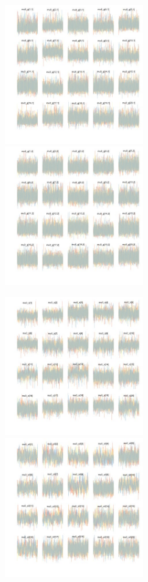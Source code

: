 \documentclass[varwidth=\maxdimen,border=0pt]{standalone}
\begin{document}
    

\begin{figure}

    \begin{subfigure}{6cm}
        \centering
                \includegraphics[width=6cm]{../../figures/convergence/convergence-belowground-mu0_g-1.jpeg} 
                \includegraphics[width=6cm]{../../figures/convergence/convergence-belowground-mu0_g-2.jpeg} 
    \end{subfigure}%
           \begin{subfigure}{6cm}
        \centering
                \includegraphics[width=6cm]{../../figures/convergence/convergence-belowground-mu0_s-1.jpeg} 
                \includegraphics[width=6cm]{../../figures/convergence/convergence-belowground-mu0_s0-1.jpeg} 
          \end{subfigure}%
\end{figure}
\end{document}
